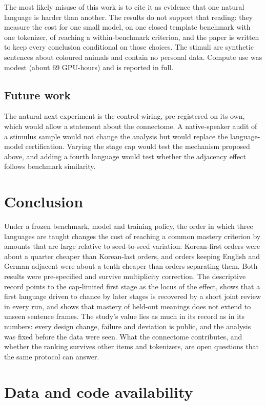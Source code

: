 \documentclass[preprint,12pt,authoryear]{elsarticle}
\begin{document}
The most likely misuse of this work is to cite it as evidence that one natural language is harder than another. The results do not support that reading: they measure the cost for one small model, on one closed template benchmark with one tokenizer, of reaching a within-benchmark criterion, and the paper is written to keep every conclusion conditional on those choices. The stimuli are synthetic sentences about coloured animals and contain no personal data. Compute use was modest (about 69 GPU-hours) and is reported in full.

\subsection{Future work}

The natural next experiment is the control wiring, pre-registered on its own, which would allow a statement about the connectome. A native-speaker audit of a stimulus sample would not change the analysis but would replace the language-model certification. Varying the stage cap would test the mechanism proposed above, and adding a fourth language would test whether the adjacency effect follows benchmark similarity.


\section{Conclusion}

Under a frozen benchmark, model and training policy, the order in which three languages are taught changes the cost of reaching a common mastery criterion by amounts that are large relative to seed-to-seed variation: Korean-first orders were about a quarter cheaper than Korean-last orders, and orders keeping English and German adjacent were about a tenth cheaper than orders separating them. Both results were pre-specified and survive multiplicity correction. The descriptive record points to the cap-limited first stage as the locus of the effect, shows that a first language driven to chance by later stages is recovered by a short joint review in every run, and shows that mastery of held-out meanings does not extend to unseen sentence frames. The study's value lies as much in its record as in its numbers: every design change, failure and deviation is public, and the analysis was fixed before the data were seen. What the connectome contributes, and whether the ranking survives other items and tokenizers, are open questions that the same protocol can answer.

\section*{Data and code availability}
\end{document}
